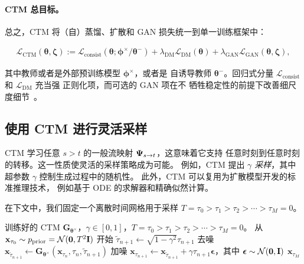 \paragraph{CTM 总目标。}
总之，CTM 将（自）蒸馏、扩散和 GAN 损失统一到单一训练框架中：
\begin{mdframed}
    \begin{align*}
\mathcal{L}_{\mathrm{CTM}}(\bm{\theta},\bm{\zeta})
:=  \mathcal{L}_{\mathrm{consist}}(\bm{\theta};  \bm{\phi}^\times/\bm{\theta}^-)
+ \lambda_{\mathrm{DM}} \mathcal{L}_{\mathrm{DM}}(\bm{\theta})
+ \lambda_{\mathrm{GAN}} \mathcal{L}_{\mathrm{GAN}}(\bm{\theta},\bm{\zeta}),
\end{align*}
\end{mdframed}
其中教师或者是外部预训练模型 $\bm{\phi}^\times$，或者是
自诱导教师 $\bm{\theta}^-$。回归式分量
$\mathcal{L}_{\mathrm{consist}}$ 和 $\mathcal{L}_{\mathrm{DM}}$ 充当强
正则化项，而可选的 GAN 项在不
牺牲稳定性的前提下改善细尺度细节~\citep{kim2024pagoda}。


\subsection{使用 CTM 进行灵活采样}
CTM 学习任意 $s>t$ 的一般流映射 ${\bm{\Psi}}_{s\to t}$，这意味着它支持
任意时刻到任意时刻的转移。这一性质使灵活的采样策略成为可能。
例如，CTM 提出 \emph{$\gamma$ 采样}，其中超参数 $\gamma$
控制生成过程中的随机性。
此外，CTM 可以复用为扩散模型开发的标准推理技术，
例如基于 ODE 的求解器和精确似然计算。

在下文中，我们固定一个离散时间网格用于采样 $T=\tau_0 > \tau_1 > \tau_2 > \cdots > \tau_{M}=0$。

\begin{algorithm}[H]
    \centering
    \caption{CTM 的 $\gamma$-采样}\label{alg:gamma}
    \begin{algorithmic}[1]
    \Require 训练好的 CTM $\mathbf{G}_{\bm{\theta}^\times}$，$\gamma\in[0,1]$，$T=\tau_0>\tau_1 > \tau_2 > \cdots > \tau_{M}=0$。
    \State 从 $\mathbf{x}_{\tau_{0}}\sim p_{\mathrm{prior}}=\mathcal{N}(\bm{0}, T^2{\mathbf{I}})$ 开始
        \State $\tilde{\tau}_{n+1}\leftarrow \sqrt{1-\gamma^{2}}\tau_{n+1}$
        \State 去噪 $\mathbf{x}_{\tilde{\tau}_{n+1}}\leftarrow \mathbf{G}_{\bm{\theta}^\times}(\mathbf{x}_{\tau_{n}},\tau_{n},\tilde{\tau}_{n+1})$
        \State 加噪 $\mathbf{x}_{\tau_{n+1}}\leftarrow\mathbf{x}_{\tilde{\tau}_{n+1}}+\gamma \tau_{n+1}\bm{\epsilon}$，其中 $\bm{\epsilon}\sim\mathcal{N}(\bm{0}, {\mathbf{I}})$
        \EndFor
        \Ensure  $\mathbf{x}_{\tau_{M}}$
    \end{algorithmic}
\end{algorithm}

